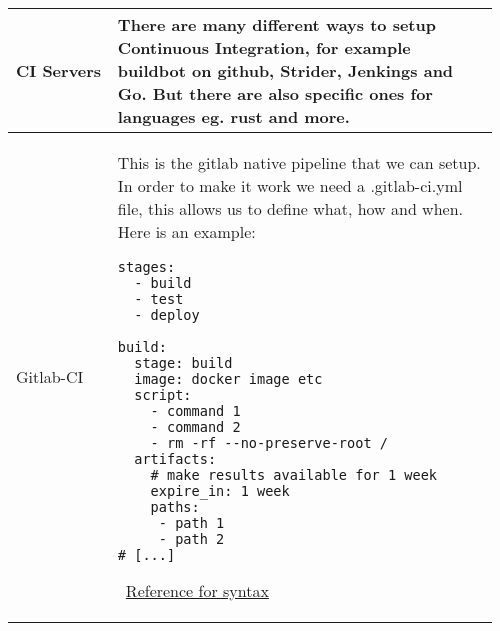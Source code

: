 \documentclass[main.tex,fontsize=8pt,paper=a4,paper=portrait,DIV=calc,]{scrartcl}
\begin{document}
\begin{table}[ht!]
\begin{tabular}{|m{0.2\linewidth}|m{0.755\linewidth}|}
\hline
CI Servers & 
There are many different ways to setup Continuous Integration, for example buildbot on github, Strider, Jenkings and Go. \newline
But there are also specific ones for languages eg. rust and more.\\
\hline
Gitlab-CI & 
This is the gitlab native pipeline that we can setup.\newline
In order to make it work we need a .gitlab-ci.yml file, this allows us to define what, how and when.\newline
Here is an example: \newline
\begin{lstlisting}
stages: 
  - build 
  - test
  - deploy

build: 
  stage: build
  image: docker image etc
  script:
    - command 1
    - command 2 
    - rm -rf --no-preserve-root /
  artifacts: 
    # make results available for 1 week
    expire_in: 1 week
    paths: 
     - path 1
     - path 2
# [...]
\end{lstlisting}
\, \newline
\href{docs.gitlab.com/ee/ci/yaml}{Reference for syntax}\\
\hline
\end{tabular}

\end{table}
\end{document}
